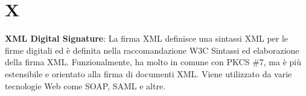\section*{X}
\textbf{XML Digital Signature}: La firma XML definisce una sintassi XML per le firme digitali ed è definita nella raccomandazione W3C Sintassi ed elaborazione della firma XML. Funzionalmente, ha molto in comune con PKCS \#7, ma è più estensibile e orientato alla firma di documenti XML. Viene utilizzato da varie tecnologie Web come SOAP, SAML e altre.\\